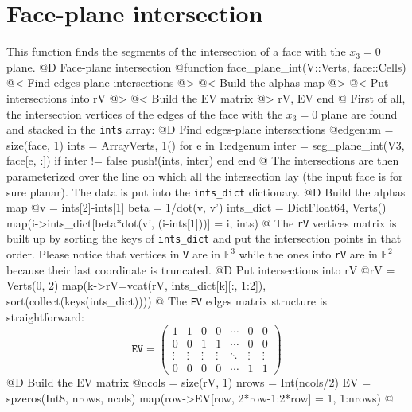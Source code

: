 \documentclass[10pt,oneside]{article}
\begin{document}
\section{Face-plane intersection}
This function finds the segments of the intersection of a face with the $x_3=0$ plane.
@D Face-plane intersection
@{function face_plane_int(V::Verts, face::Cells)
    @< Find edges-plane intersections @>
    @< Build the alphas map @>
    @< Put intersections into rV @>
    @< Build the EV matrix @>
    rV, EV
end
@}
First of all, the intersection vertices of the edges of the face with the $x_3=0$ plane are found and stacked in the \texttt{ints} array:
@D Find edges-plane intersections
@{edgenum = size(face, 1)
ints = Array{Verts, 1}()
for e in 1:edgenum
    inter = seg_plane_int(V3, face[e, :])
    if inter != false
        push!(ints, inter)
    end
end
@}
The intersections are then parameterized over the line on which all the intersection lay (the input face is for sure planar).
The data is put into the \texttt{ints\_dict} dictionary.
@D Build the alphas map
@{v = ints[2]-ints[1]
beta = 1/dot(v, v')
ints_dict = Dict{Float64, Verts}()
map(i->ints_dict[beta*dot(v', (i-ints[1]))] = i, ints)
@}
The \texttt{rV} vertices matrix is built up by sorting the keys of \texttt{ints\_dict} and put the intersection points in that order.
Please notice that vertices in \texttt{V} are in $\mathbb{E}^3$ while the ones into \texttt{rV} are in $\mathbb{E}^2$ because
their last coordinate is truncated.
@D Put intersections into rV
@{rV = Verts(0, 2)
map(k->rV=vcat(rV, ints_dict[k][:, 1:2]), sort(collect(keys(ints_dict))))
@}
The \texttt{EV} edges matrix structure is straightforward:
\[
    \texttt{EV} = 
    \begin{pmatrix}
        1 & 1 & 0 & 0 & \cdots & 0 & 0 \\
        0 & 0 & 1 & 1 & \cdots & 0 & 0 \\
        \vdots & \vdots & \vdots & \vdots & \ddots & \vdots & \vdots \\
        0 & 0 & 0 & 0 & \cdots & 1 & 1
    \end{pmatrix}
\]
@D Build the EV matrix
@{ncols = size(rV, 1)
nrows = Int(ncols/2)
EV = spzeros(Int8, nrows, ncols)
map(row->EV[row, 2*row-1:2*row] = 1, 1:nrows)
@}


\end{document}
